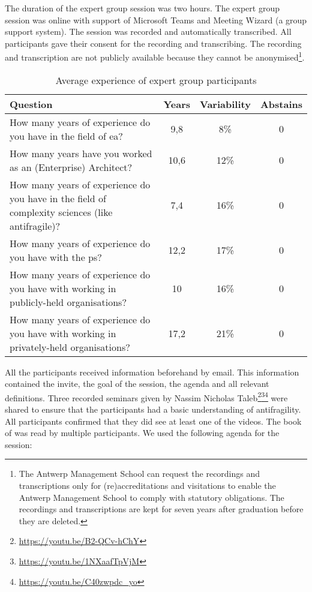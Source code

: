 The duration of the expert group session was two hours. The expert group session was online with support of Microsoft Teams and Meeting Wizard (a group support system). The session was recorded and automatically transcribed. All participants gave their consent for the recording and transcribing. The recording and transcription are not publicly available because they cannot be anonymised\footnote{The Antwerp Management School can request the recordings and transcriptions only for (re)accreditations and visitations to enable the Antwerp Management School to comply with statutory obligations. The recordings and transcriptions are kept for seven years after graduation before they are deleted.}.
\begin{longtable}{@{}p{}ccc@{}}
	\toprule%
	\textbf{Question} & \textbf{Years} & \textbf{Variability} & \textbf{Abstains} \\
	\midrule%
	\endhead%
	\hline
	\endfoot%
	\caption[Average experience of expert group participants]{Average experience of expert group participants}
	\label{tab:experiencevalidationgroup}%
	\endlastfoot%
	How many years of experience do you have in the field of \acrlong{ea}? & 9,8 & 8\% & 0 \\%
	How many years have you worked as an (Enterprise) Architect? & 10,6 & 12\% & 0 \\%
	How many years of experience do you have in the field of complexity sciences (like \gls{antifragile})? & 7,4 & 16\% & 0 \\%
	How many years of experience do you have with the \gls{ps}? & 12,2 & 17\% & 0 \\%
	How many years of experience do you have with working in publicly-held organisations? & 10 & 16\% & 0 \\%
	How many years of experience do you have with working in privately-held organisations? & 17,2 & 21\% & 0 \\%
	\bottomrule%
\end{longtable}
All the participants received information beforehand by email. This information contained the invite, the goal of the session, the agenda and all relevant definitions. Three recorded seminars given by Nassim Nicholas Taleb\footnote{\url{https://youtu.be/B2-QCv-hChY}}\footnote{\url{https://youtu.be/1NXaafTpVjM}}\footnote{\url{https://youtu.be/C40zwpdc_yo}} were shared to ensure that the participants had a basic understanding of \gls{antifragility}. All participants confirmed that they did see at least one of the videos. The book of \textcite{Taleb2012} was read by multiple participants. We used the following agenda for the session:
